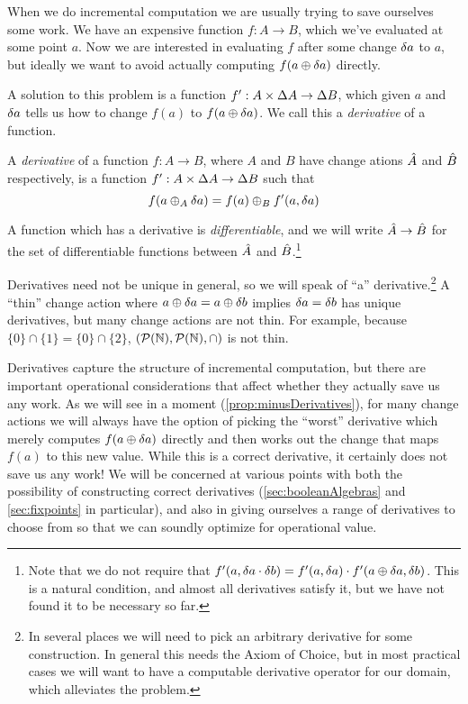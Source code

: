 When we do incremental computation we are usually trying to save ourselves some
work. We have an expensive function $f: A \rightarrow B$, which we've evaluated at some point
$a$. Now we are interested in evaluating $f$ after some change $\delta a$ to
$a$, but ideally we want to avoid actually computing $f(a \oplus
\delta a)$ directly.

A solution to this problem is a function $f': A \times \Delta A
\rightarrow \Delta B$, which given $a$ and $\delta a$ tells us how to change
$f(a)$ to $f(a \oplus \delta a)$. We call this a \emph{derivative} of a function.

\begin{defn}[Derivatives]
  \label{def:derivative}
  A \emph{derivative} of a function $f: A \rightarrow B$, where $A$ and $B$ have
  change ations $\hat{A}$ and $\hat{B}$ respectively, is a function $f': A \times \Delta A \rightarrow
  \Delta B$ such that
  \begin{displaymath}
    f(a \oplus_A \delta a) = f(a) \oplus_B f'(a, \delta a)
  \end{displaymath}

  A function which has a derivative is 
  \emph{differentiable}, and we will write $\hat{A} \rightarrow \hat{B}$ for
  the set of differentiable functions between $\hat{A}$ and $\hat{B}$.\footnote{Note that we do not require that $f'(a,
    \delta a \cdot \delta b) = f'(a, \delta a) \cdot f'(a
    \oplus \delta a, \delta b)$. This is a natural condition, and almost all
    derivatives satisfy it, but we have not found it to be necessary so far.}
\end{defn}

Derivatives need not be unique in general, so we will speak of ``a''
derivative.\footnote{In several places we will need to pick an arbitrary
  derivative for some construction. In general this needs the Axiom of Choice,
  but in most practical cases we will want to have a computable derivative
  operator for our domain, which alleviates the problem.} A ``thin'' change
action \textemdash{} where $a \oplus \delta a = a \oplus \delta b$ implies $\delta a =
\delta b$ \textemdash{} has unique derivatives, but many change actions are not thin.
For example, because $\{0\} \cap \{1\} = \{0\}
\cap \{2\}$, $(\mathcal{P}(\mathbb{N}),\mathcal{P}(\mathbb{N}),\cap)$ is not thin.

Derivatives capture the structure of incremental computation, but there are
important operational considerations that affect whether they actually save us
any work. As we will see in a moment (\cref{prop:minusDerivatives}), for many 
change actions we will always have the option
of picking the ``worst'' derivative which merely computes $f(a \oplus \delta a)$
directly and then works out the change that maps $f(a)$ to this new value. While this is a correct
derivative, it certainly does not save us any work! We will be concerned at
various points with both the possibility of constructing correct derivatives
(\cref{sec:booleanAlgebras} and \cref{sec:fixpoints} in particular), and also in
giving ourselves a range of derivatives to choose from so that we can soundly
optimize for operational value.

